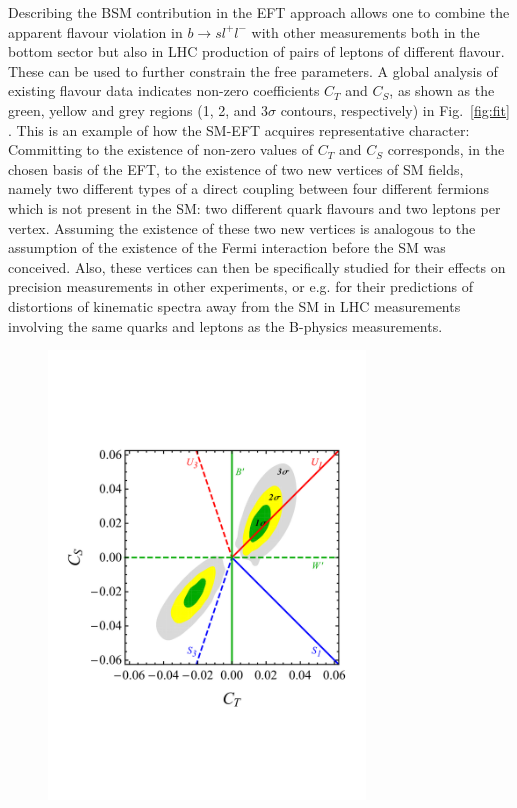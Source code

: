{Describing the BSM contribution in the EFT approach allows one to
combine the apparent flavour violation in $b \to sl^+l^-$ with other
measurements both in the bottom sector but also in LHC production of
pairs of leptons of different flavour. These can be used
to further constrain the free parameters.  A global analysis of
existing flavour data \citep[see, e.g.,][]{Albrecht:2018frt} indicates
non-zero coefficients $C_T$ and $C_S$, as shown as the green, yellow
and grey regions (1, 2, and 3$\sigma$ contours, respectively) in
Fig.~\ref{fig:fit} \citep{Buttazzo:2017ixm}.  This is an example of
how the SM-EFT acquires representative character: Committing to the
existence of non-zero values of $C_T$ and $C_S$ corresponds, in the
chosen basis of the EFT, to the existence of two new vertices of SM
fields, namely two different types of a direct coupling between four
different fermions which is not present in the SM: two different
quark flavours and two leptons per vertex. Assuming the existence of
these two new vertices is analogous to the assumption of the existence
of the Fermi interaction before the SM was conceived. Also, these
vertices can then be specifically studied for their effects on
precision measurements in other experiments, or e.g.{} for their
predictions of distortions of kinematic spectra away from the SM in
LHC measurements involving the same quarks and leptons as the
B-physics measurements.
\begin{figure}[tbh]
\begin{center}
      \includegraphics[width=0.75\textwidth]{SMS_fit.pdf} 

\end{center}
\end{figure}}

